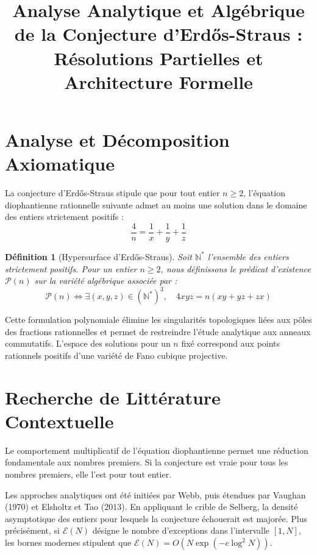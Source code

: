\documentclass[12pt,a4paper]{article}
\title{Analyse Analytique et Algébrique de la Conjecture d'Erd\H{o}s-Straus : Résolutions Partielles et Architecture Formelle}
\author{}
\date{}
\newtheorem{definition}{Définition}
\begin{document}
\maketitle
\tableofcontents
\newpage

\section{Analyse et Décomposition Axiomatique}

La conjecture d'Erd\H{o}s-Straus stipule que pour tout entier $n \geq 2$, l'équation diophantienne rationnelle suivante admet au moins une solution dans le domaine des entiers strictement positifs :
\begin{equation}
\frac{4}{n} = \frac{1}{x} + \frac{1}{y} + \frac{1}{z}
\end{equation}

\begin{definition}[Hypersurface d'Erd\H{o}s-Straus]
Soit $\mathbb{N}^*$ l'ensemble des entiers strictement positifs. Pour un entier $n \geq 2$, nous définissons le prédicat d'existence $\mathcal{P}(n)$ sur la variété algébrique associée par :
\begin{equation}
\mathcal{P}(n) \iff \exists (x,y,z) \in (\mathbb{N}^*)^3, \quad 4xyz = n(xy + yz + zx)
\end{equation}
\end{definition}

Cette formulation polynomiale élimine les singularités topologiques liées aux pôles des fractions rationnelles et permet de restreindre l'étude analytique aux anneaux commutatifs. L'espace des solutions pour un $n$ fixé correspond aux points rationnels positifs d'une variété de Fano cubique projective.

\section{Recherche de Littérature Contextuelle}

Le comportement multiplicatif de l'équation diophantienne permet une réduction fondamentale aux nombres premiers. Si la conjecture est vraie pour tous les nombres premiers, elle l'est pour tout entier.

Les approches analytiques ont été initiées par Webb, puis étendues par Vaughan (1970) et Elsholtz et Tao (2013). En appliquant le crible de Selberg, la densité asymptotique des entiers pour lesquels la conjecture échouerait est majorée.
Plus précisément, si $\mathcal{E}(N)$ désigne le nombre d'exceptions dans l'intervalle $[1, N]$, les bornes modernes stipulent que $\mathcal{E}(N) = O(N \exp(-c \log^2 N))$.
\end{document}
